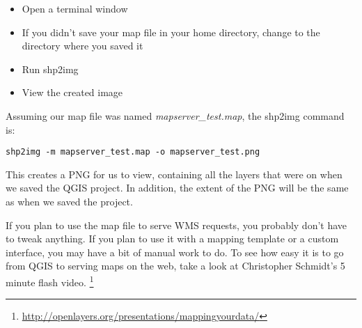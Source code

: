 \begin{itemize}
\item Open a terminal window
\item If you didn't save your map file in your home directory, change to
  the directory where you saved it
\item Run shp2img 
\item View the created image 
\end{itemize}
 
Assuming our map file was named \textsl{mapserver\_test.map}, the
shp2img command is:

\begin{verbatim}
shp2img -m mapserver_test.map -o mapserver_test.png
\end{verbatim}

This creates a PNG for us to view, containing all the layers that were on
when we saved the QGIS project. In addition, the extent of the PNG will be the same as
when we saved the project.

If you plan to use the map file to serve WMS requests, you probably don't
have to tweak anything. If you plan to use it with a mapping template or a
custom interface, you may have a bit of manual work to do. To see how easy
it is to go from QGIS to serving maps on the web, take a look at
Christopher Schmidt's 5 minute flash video.
\footnote{\url{http://openlayers.org/presentations/mappingyourdata/}}
